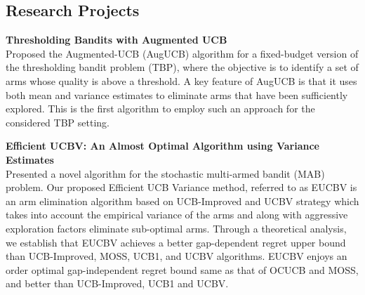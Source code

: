 \documentclass[margin,11pt]{res}
\begin{document}
\begin{resume}
\section{Research Projects}
\par 

\textbf{Thresholding Bandits with Augmented UCB}\\
Proposed the Augmented-UCB (AugUCB) algorithm for a fixed-budget version of the thresholding bandit problem (TBP), where the objective is to identify a set of arms whose quality is above a threshold. A key feature of AugUCB is that it uses both mean and variance estimates to eliminate arms that have been sufficiently explored. This is the first algorithm to employ such an approach for the considered TBP setting.
\par

\textbf{Efficient UCBV: An Almost Optimal Algorithm using Variance Estimates}\\
Presented a novel algorithm for the stochastic multi-armed bandit (MAB) problem. Our proposed Efficient UCB Variance method, referred to as EUCBV is an arm elimination algorithm based on UCB-Improved and UCBV strategy which takes into account the empirical variance of the arms and along with aggressive exploration factors eliminate sub-optimal arms. Through a theoretical analysis, we establish that EUCBV achieves a better gap-dependent regret upper bound than UCB-Improved, MOSS, UCB1, and UCBV algorithms. EUCBV enjoys an order optimal gap-independent regret bound same as that of OCUCB and MOSS, and better than UCB-Improved, UCB1 and UCBV.
\par


\end{resume}
\end{document}
